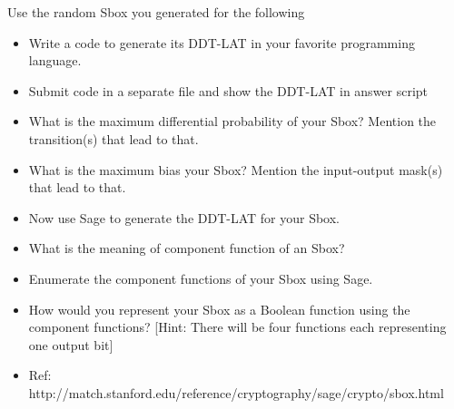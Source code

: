 \documentclass[10pt, a4paper]{article}
\begin{document}
\newpage
\begin{Problem}

Use the random Sbox you generated for the following

\begin{itemize}
\item Write a code to generate its DDT-LAT in your favorite programming language.
\item Submit code in a separate file and show the DDT-LAT in answer script
\item What is the maximum differential probability of your Sbox? Mention the transition(s)
that lead to that.
\item What is the maximum bias your Sbox? Mention the input-output mask(s) that lead to
that.
\item Now use Sage to generate the DDT-LAT for your Sbox.
\item What is the meaning of component function of an Sbox?
\item Enumerate the component functions of your Sbox using Sage.
\item How would you represent your Sbox as a Boolean function using the component functions?
[Hint: There will be four functions each representing one output bit]
\item Ref: http://match.stanford.edu/reference/cryptography/sage/crypto/sbox.html
\end{itemize}

\end{Problem}
\end{document}

